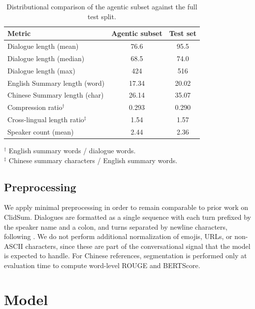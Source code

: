 \documentclass[11pt]{article}
\begin{document}
\begin{table}[ht]
\centering
\footnotesize
\setlength{\tabcolsep}{4pt}
\begin{tabular}{lcc}
\hline
\textbf{Metric} & \textbf{Agentic subset} & \textbf{Test set}  \\
\hline
Dialogue length (mean)        & 76.6  & 95.5       \\
Dialogue length (median)      & 68.5  & 74.0       \\
Dialogue length (max)         & 424   & 516        \\
English Summary length (word)        & 17.34   & 20.02        \\
Chinese Summary length (char)        & 26.14   & 35.07        \\
Compression ratio$^{\dagger}$        & 0.293 & 0.290     \\
Cross-lingual length ratio$^{\ddagger}$ & 1.54  & 1.57   \\
Speaker count (mean)                 & 2.44  & 2.36    \\
\hline
\end{tabular}

\vspace{2pt}
\footnotesize
\raggedright
\caption{Distributional comparison of the agentic subset against the full test split.
}
$^{\dagger}$ English summary words / dialogue words. \\
$^{\ddagger}$ Chinese summary characters / English summary words.
\label{tab:subset-comparison}
\end{table}


\subsection{Preprocessing}
We apply minimal preprocessing in order to remain comparable to prior work on ClidSum. Dialogues are formatted as a single sequence with each turn prefixed by the speaker name and a colon, and turns separated by newline characters, following \citet{wang-etal-2022-clidsum}. We do not perform additional normalization of emojis, URLs, or non-ASCII characters, since these are part of the conversational signal that the model is expected to handle. For Chinese references, segmentation is performed only at evaluation time to compute word-level ROUGE and BERTScore.

\section{Model}
\end{document}
